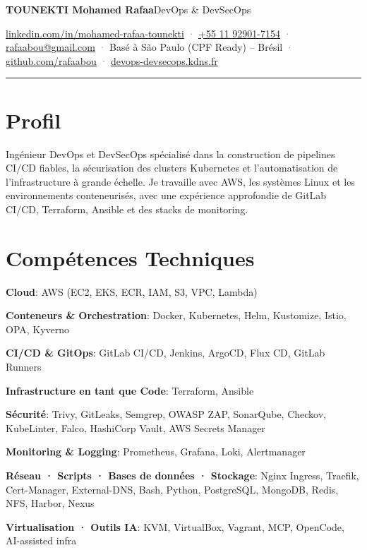 \documentclass[10pt,a4paper]{article}
\begin{document}
{\LARGE\bfseries TOUNEKTI Mohamed Rafaa}\hfill{\small DevOps \& DevSecOps}\par
\vspace{3pt}
{\footnotesize \href{https://linkedin.com/in/mohamed-rafaa-tounekti}{linkedin.com/in/mohamed-rafaa-tounekti} \textcolor{graytext}{·} \href{tel:+5511929017154}{+55 11 92901-7154} \textcolor{graytext}{·} \href{mailto:rafaabou@gmail.com}{rafaabou@gmail.com} \textcolor{graytext}{·} Basé à São Paulo (CPF Ready) – Brésil \textcolor{graytext}{·} \href{https://github.com/rafaabou}{github.com/rafaabou} \textcolor{graytext}{·} \href{https://devops-devsecops.kdns.fr/}{devops-devsecops.kdns.fr}}\par
\vspace{2pt}\hrule\vspace{2pt}
\section*{Profil}
Ingénieur DevOps et DevSecOps spécialisé dans la construction de pipelines CI/CD fiables, la sécurisation des clusters Kubernetes et l'automatisation de l'infrastructure à grande échelle. Je travaille avec AWS, les systèmes Linux et les environnements conteneurisés, avec une expérience approfondie de GitLab CI/CD, Terraform, Ansible et des stacks de monitoring.\par
\section*{Compétences Techniques}
\textbf{Cloud}: AWS (EC2, EKS, ECR, IAM, S3, VPC, Lambda)\par
\textbf{Conteneurs \& Orchestration}: Docker, Kubernetes, Helm, Kustomize, Istio, OPA, Kyverno\par
\textbf{CI/CD \& GitOps}: GitLab CI/CD, Jenkins, ArgoCD, Flux CD, GitLab Runners\par
\textbf{Infrastructure en tant que Code}: Terraform, Ansible\par
\textbf{Sécurité}: Trivy, GitLeaks, Semgrep, OWASP ZAP, SonarQube, Checkov, KubeLinter, Falco, HashiCorp Vault, AWS Secrets Manager\par
\textbf{Monitoring \& Logging}: Prometheus, Grafana, Loki, Alertmanager\par
\textbf{Réseau · Scripts · Bases de données · Stockage}: Nginx Ingress, Traefik, Cert-Manager, External-DNS, Bash, Python, PostgreSQL, MongoDB, Redis, NFS, Harbor, Nexus\par
\textbf{Virtualisation · Outils IA}: KVM, VirtualBox, Vagrant, MCP, OpenCode, AI-assisted infra\par
\end{document}
